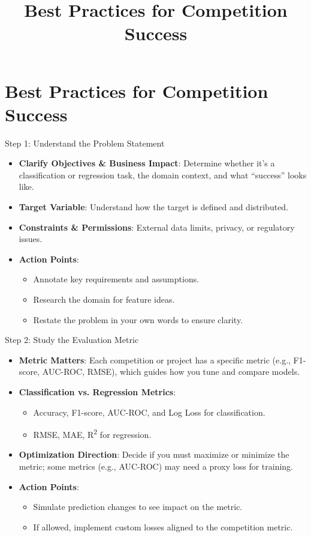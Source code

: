 \documentclass[ignorenonframetext,]{beamer}
\title{Best Practices for Competition Success}
\date{}
\begin{document}
\section{Best Practices for Competition Success}
\begin{frame}{Step 1: Understand the Problem Statement}
\begin{itemize}
  \item \textbf{Clarify Objectives \& Business Impact}: Determine whether it’s a classification or regression task, the domain context, and what “success” looks like.
  \item \textbf{Target Variable}: Understand how the target is defined and distributed.
  \item \textbf{Constraints \& Permissions}: External data limits, privacy, or regulatory issues.
  \item \textbf{Action Points}:
    \begin{itemize}
      \item Annotate key requirements and assumptions.
      \item Research the domain for feature ideas.
      \item Restate the problem in your own words to ensure clarity.
    \end{itemize}
\end{itemize}
\end{frame}

\begin{frame}{Step 2: Study the Evaluation Metric}
\begin{itemize}
  \item \textbf{Metric Matters}: Each competition or project has a specific metric (e.g., F1-score, AUC-ROC, RMSE), which guides how you tune and compare models.
  \item \textbf{Classification vs. Regression Metrics}:
    \begin{itemize}
      \item Accuracy, F1-score, AUC-ROC, and Log Loss for classification.
      \item RMSE, MAE, R\textsuperscript{2} for regression.
    \end{itemize}
  \item \textbf{Optimization Direction}: Decide if you must maximize or minimize the metric; some metrics (e.g., AUC-ROC) may need a proxy loss for training.
  \item \textbf{Action Points}:
    \begin{itemize}
      \item Simulate prediction changes to see impact on the metric.
      \item If allowed, implement custom losses aligned to the competition metric.
    \end{itemize}
\end{itemize}
\end{frame}
\end{document}
